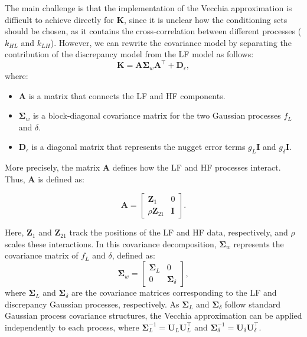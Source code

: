 \documentclass[12pt]{article}
\begin{document}

\noindent
\hangindent=-5mm
The main challenge is that the implementation of the Vecchia approximation is difficult to achieve directly for $\bm{K}$, since it is unclear how the conditioning sets should be chosen, as it contains the cross-correlation between different processes ($k_{HL}$ and $k_{LH}$). However, we can rewrite the covariance model by separating the contribution of the discrepancy model from the LF model as follows:
\[
\bm{K} = \bm{A} \bm{\Sigma}_w \bm{A}^\top + \bm{D}_{\epsilon},
\]
where:
\begin{itemize}
    \item \( \bm{A} \) is a matrix that connects the LF and HF components.
    \item \( \bm{\Sigma}_w \) is a block-diagonal covariance matrix for the two Gaussian processes \( f_L \) and \( \delta \).
    \item \( \bm{D}_{\epsilon} \) is a diagonal matrix that represents the nugget error terms \( g_L \bm{I} \) and \( g_{\delta} \bm{I} \).
\end{itemize}

\noindent
\hangindent=-5mm
More precisely, the matrix \( \bm{A} \) defines how the LF and HF processes interact. Thus, \( \bm{A} \) is defined as:

\[
\bm{A} = \begin{bmatrix} \bm{Z}_1 & 0 \\ \rho \bm{Z}_{21} & \bm{I} \end{bmatrix}.
\]

\noindent
\hangindent=-5mm
Here, \( \bm{Z}_1 \) and \( \bm{Z}_{21} \) track the positions of the LF and HF data, respectively, and \( \rho \) scales these interactions. In this covariance decomposition, \( \bm{\Sigma}_w \) represents the covariance matrix of \( f_L \) and \( \delta \), defined as:
\[
\bm{\Sigma}_w = 
\begin{bmatrix} 
\bm{\Sigma}_L & 0 \\ 
0 & \bm{\Sigma}_{\delta} 
\end{bmatrix},
\]
\noindent
\hangindent=-5mm
where \( \bm{\Sigma}_L \) and \( \bm{\Sigma}_{\delta} \) are the covariance matrices corresponding to the LF and discrepancy Gaussian processes, respectively. As \( \bm{\Sigma}_L \) and \( \bm{\Sigma}_{\delta} \) follow standard Gaussian process covariance structures, the Vecchia approximation can be applied independently to each process, where  \( \bm{\Sigma}^{-1}_{L}=\bm{U}_L \bm{U}^\top_L \) and \( \bm{\Sigma}^{-1}_{\delta}= \bm{U}_{\delta} \bm{U}^\top_{\delta} \).
\end{document}
